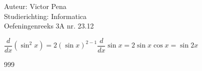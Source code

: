\documentclass[a4paper]{article}
\begin{document}
	
	\noindent \large Auteur: Victor Pena \\
	\noindent \large Studierichting: Informatica\\
	\noindent \large Oefeningenreeks 3A nr. 23.12\\
	
	\medskip
	
	\normalsize 
	
	$\dfrac{d}{dx}(\sin^2 x) = 2(\sin x)^{2-1}\dfrac{d}{dx}\sin x = 2\sin x \cos x = \sin 2x$
	
	
	\begin{thebibliography}{999}
	\end{thebibliography}
\end{document}
